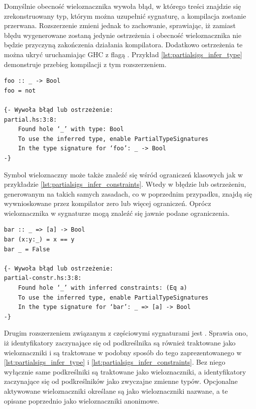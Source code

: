 {Domyślnie obecność wieloznacznika wywoła błąd, w którego treści znajdzie się
zrekonstruowany typ, którym można uzupełnić sygnaturę, a kompilacja zostanie
przerwana. Rozszerzenie  zmieni jednak to
zachowanie, sprawiając, iż zamiast błędu wygenerowane zostaną jedynie
ostrzeżenia i obecność wieloznacznika nie będzie przyczyną zakończenia działania
kompilatora. Dodatkowo ostrzeżenia te można ukryć uruchamiając GHC z flagą
. Przykład
\ref{lst:partialsigs_infer_type} demonstruje przebieg kompilacji z tym
rozszerzeniem.

\begin{lstlisting}[float,label={lst:partialsigs_infer_type},
                   caption={Przykład użycia anonimowego symbolu wieloznacznego w sygnaturze typu.}]
foo :: _ -> Bool
foo = not

{- Wywoła błąd lub ostrzeżenie:
partial.hs:3:8:
    Found hole ‘_’ with type: Bool
    To use the inferred type, enable PartialTypeSignatures
    In the type signature for ‘foo’: _ -> Bool
-}
\end{lstlisting}

Symbol wieloznaczny może także znaleźć się wśród ograniczeń klasowych jak w
przykładzie \ref{lst:partialsigs_infer_constraints}. Wtedy w błędzie lub
ostrzeżeniu, generowanym na takich samych zasadach, co w poprzednim przypadku,
znajdą się wywnioskowane przez kompilator zero lub więcej ograniczeń. Oprócz
wieloznacznika w sygnaturze mogą znaleźć się jawnie podane ograniczenia.

\begin{lstlisting}[float,label={lst:partialsigs_infer_constraints},
                   caption={Przykład użycia anonimowego symbolu wieloznacznego w ograniczeniach typu.}]
bar :: _ => [a] -> Bool
bar (x:y:_) = x == y
bar _ = False

{- Wywoła błąd lub ostrzeżenie:
partial-constr.hs:3:8:
    Found hole ‘_’ with inferred constraints: (Eq a)
    To use the inferred type, enable PartialTypeSignatures
    In the type signature for ‘bar’: _ => [a] -> Bool
-}
\end{lstlisting}

Drugim rozszerzeniem związanym z częściowymi sygnaturami jest
. Sprawia ono, iż identyfikatory zaczynające się od
podkreślnika są również traktowane jako wieloznaczniki i są traktowane w podobny
sposób do tego zaprezentowanego w \ref{lst:partialsigs_infer_type} i
\ref{lst:partialsigs_infer_constraints}. Bez niego wyłącznie same podkreślniki
są traktowane jako wieloznaczniki, a identyfikatory zaczynające się od
podkreślników jako zwyczajne zmienne typów. Opcjonalne aktywowane wieloznaczniki
określane są jako wieloznaczniki nazwane, a te opisane poprzednio jako
wieloznaczniki anonimowe.

}
